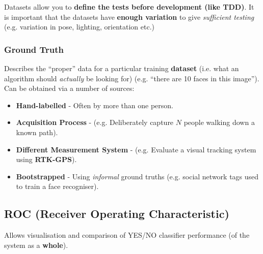 \documentclass[english, 10pt]{article}
\begin{document}
Datasets allow you to \textbf{define the tests before development (like TDD)}. It is important that the datasets have \textbf{enough variation} to give \textit{sufficient testing} (e.g. variation in pose, lighting, orientation etc.)

\subsubsection{Ground Truth}

Describes the ``proper'' data for a particular training \textbf{dataset} (i.e. what an algorithm should \textit{actually} be looking for) (e.g. ``there are 10 faces in this image''). \\

Can be obtained via a number of sources:

\begin{itemize}
\item \textbf{Hand-labelled} - Often by more than one person.
\item \textbf{Acquisition Process} - (e.g. Deliberately  capture $N$ people walking down a known path).
\item \textbf{Different Measurement System }- (e.g. Evaluate a visual tracking system using \textbf{RTK-GPS}).
\item \textbf{Bootstrapped} - Using \textit{informal} ground truths (e.g. social network tags used to train a face recogniser). 
\end{itemize}

\subsection{ROC (Receiver Operating Characteristic)}

Allows visualisation and comparison of YES/NO classifier performance (of the system as a \textbf{whole}). 
\end{document}
